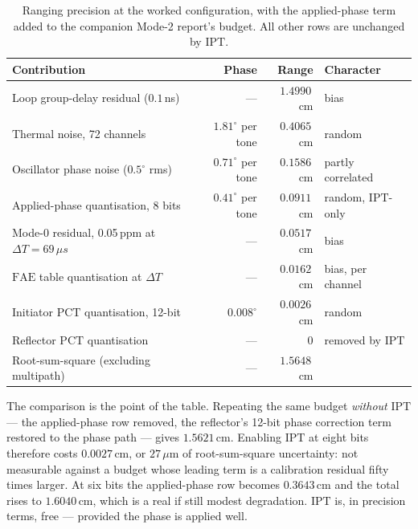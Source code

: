 \documentclass[11pt,a4paper]{article}
\newcommand{\us}{\,\ensuremath{\upmu}s}
\newcommand{\PCT}{\ensuremath{\mathrm{PCT}}}
\newcommand{\IPT}{\ensuremath{\mathrm{IPT}}}
\newcommand{\FAE}{\ensuremath{\mathrm{FAE}}}
\providecommand{\upmu}{\mu}
\begin{document}
\begin{table}[h]
\caption{Ranging precision at the worked configuration, with the applied-phase term added to the
companion Mode-2 report's budget. All other rows are unchanged by \IPT.}
\label{tab:example}
\centering\small
\begin{tabular}{@{}L{54mm}rrL{26mm}@{}}
\toprule
Contribution & Phase & Range & Character \\
\midrule
Loop group-delay residual ($0.1$\,ns) & --- & $1.4990$\,cm & bias \\
Thermal noise, 72 channels & $1.81^{\circ}$ per tone & $0.4065$\,cm & random \\
Oscillator phase noise ($0.5^{\circ}$ rms) & $0.71^{\circ}$ per tone & $0.1586$\,cm & partly correlated \\
Applied-phase quantisation, 8 bits & $0.41^{\circ}$ per tone & $0.0911$\,cm & random, \IPT-only \\
Mode-0 residual, 0.05\,ppm at $\Delta T=69\us$ & --- & $0.0517$\,cm & bias \\
$\FAE$ table quantisation at $\Delta T$ & --- & $0.0162$\,cm & bias, per channel \\
Initiator $\PCT$ quantisation, 12-bit & $0.008^{\circ}$ & $0.0026$\,cm & random \\
Reflector $\PCT$ quantisation & --- & $0$ & removed by \IPT \\
\midrule
Root-sum-square (excluding multipath) & --- & $1.5648$\,cm & \\
\bottomrule
\end{tabular}
\end{table}

The comparison is the point of the table. Repeating the same budget \emph{without} \IPT{} --- the
applied-phase row removed, the reflector's 12-bit phase correction term restored to the phase path
--- gives $1.5621$\,cm. Enabling \IPT{} at eight bits therefore costs $0.0027$\,cm, or
$27\,\upmu$m of root-sum-square uncertainty: not measurable against a budget whose leading term is a
calibration residual fifty times larger. At six bits the applied-phase row becomes $0.3643$\,cm and
the total rises to $1.6040$\,cm, which is a real if still modest degradation. \IPT{} is, in precision
terms, free --- provided the phase is applied well.
\end{document}

